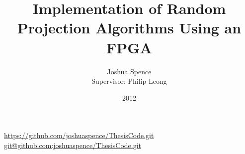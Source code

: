 \usepackage{definevariable} %
\usepackage{persons} %


\uosAssessment{}{\thesis}

\urldef{\gitRepoHTTP}\url{https://github.com/joshuaspence/ThesisCode.git}
\urldef{\gitRepoSSH}\url{git@github.com:joshuaspence/ThesisCode.git}


\newcommand*\pdfmetadata{%
    pdfauthor={Joshua Spence},
    pdftitle={Implementation of Random Projection Algorithms Using an FPGA},
    pdfsubject={},
    pdfkeywords={commute time,anomaly detection,FPGA},
    pdfdisplaydoctitle={true}
}

\newcommand\IntelXeon{Intel\textsuperscript{\textregistered} Xeon\textsuperscript{\textregistered}}
\newcommand\IntelCoreiSeven{Intel\textsuperscript{\textregistered} Core\textsuperscript{\texttrademark} i7}
\newcommand\AutoESL{\software{Xilinx\textsuperscript{\textregistered} AutoESL}}
\newcommand\ModelSim{\software{Altera\textsuperscript{\textregistered} ModelSim}}
\newcommand\Xilinx{Xilinx\textsuperscript{\textregistered}}
\newcommand\ARM{ARM\textsuperscript{\textregistered}}
\newcommand\Cortex{Cortex\textsuperscript{\texttrademark}}

\title[Random Projection Algorithms Using an FPGA]{Implementation of Random Projection Algorithms Using an FPGA}
\author[Joshua Spence]{Joshua Spence\\{\tiny{Supervisor: Philip Leong}}}
\date{2012}

